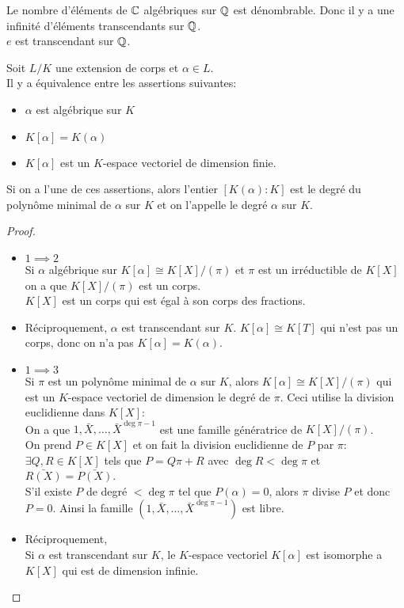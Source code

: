 \begin{remarque}
	Le nombre d'éléments de $\mathbb{C}$ algébriques sur $\mathbb{Q}$ est dénombrable. Donc il y a une infinité d'éléments transcendants sur $\mathbb{Q}$.\\
	$e$ est transcendant sur $\mathbb{Q}$.
\end{remarque}


\begin{prop}
	Soit $L/K$ une extension de corps et $\alpha \in L$.\\
	Il y a équivalence entre les assertions suivantes:
	\begin{itemize}
		\item $\alpha$ est algébrique sur $K$
		\item $K[\alpha] = K(\alpha)$
		\item $K[\alpha]$ est un $K$-espace vectoriel de dimension finie.
	\end{itemize}
	Si on a l'une de ces assertions, alors l'entier $[K(\alpha) : K]$ est le degré du polynôme minimal de $\alpha$ sur $K$ et on l'appelle le degré $\alpha$ sur $K$.
\end{prop}

\begin{proof}
	\begin{itemize}
		\item $1 \implies 2$\\
		      Si $\alpha$ algébrique sur $K[\alpha] \cong K[X]/(\pi)$ et $\pi$ est un irréductible de $K[X]$ on a que $K[X]/(\pi)$ est un corps.\\
		      $K[X]$ est un corps qui est égal à son corps des fractions.
		\item Réciproquement, $\alpha$ est transcendant sur $K$.
		      $K[\alpha] \cong K[T]$ qui n'est pas un corps, donc on n'a pas $K[\alpha] = K(\alpha)$.
		\item $1 \implies 3$\\
		      Si $\pi$ est un polynôme minimal de $\alpha$ sur $K$, alors $K[\alpha] \cong K[X]/(\pi)$ qui est un $K$-espace vectoriel de dimension le degré de $\pi$.
		      Ceci utilise la division euclidienne dans $K[X]$:\\
		      On a que $1, \bar{X}, \ldots, \bar{X}^{\deg \pi - 1}$ est une famille génératrice de $K[X]/(\pi)$.\\
		      On prend $P\in K[X]$ et on fait la division euclidienne de $P$ par $\pi$:
		      $\exists Q, R \in K[X]$ tels que $P = Q\pi + R$ avec $\deg R < \deg \pi$ et $\bar{R(X)} = \bar{P(X)}$.\\
		      S'il existe $P$ de degré $< \deg \pi$ tel que $P(\alpha) = 0$, alors $\pi$ divise $P$ et donc $P = 0$.
		      Ainsi la famille $(1, \bar X, \ldots, \bar X^{\deg \pi - 1})$ est libre.
		\item Réciproquement, \\
		      Si $\alpha$ est transcendant sur $K$, le $K$-espace vectoriel $K[\alpha]$ est isomorphe a $K[X]$ qui est de dimension infinie.
	\end{itemize}
\end{proof}

